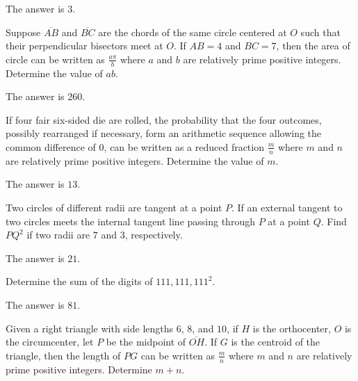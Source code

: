 \begin{solution}
The answer is $3$.
\end{solution}

\begin{problem}
Suppose $\overline{AB}$ and $\overline{BC}$ are the chords of the same circle centered at $O$ such that their perpendicular bisectors meet at $O$. If $AB=4$ and $BC=7$, then the area of circle can be written as $\frac{a\pi}{b}$ where $a$ and $b$ are relatively prime positive integers. Determine the value of $ab$.
\end{problem}

\begin{solution}
The answer is $260$.
\end{solution}

\begin{problem}
If four fair six-sided die are rolled, the probability that the four outcomes, possibly rearranged if necessary, form an arithmetic sequence allowing the common difference of $0$, can be written as a reduced fraction $\frac{m}{n}$ where $m$ and $n$ are relatively prime positive integers. Determine the value of $m$.
\end{problem}

\begin{solution}
The answer is $13$.
\end{solution}

\begin{problem}
Two circles of different radii are tangent at a point $P$. If an external tangent to two circles meets the internal tangent line passing through $P$ at a point $Q$. Find $PQ^2$ if two radii are $7$ and $3$, respectively.
\end{problem}

\begin{solution}
The answer is $21$.
\end{solution}

\begin{problem}
Determine the sum of the digits of $111,111,111^2$.
\end{problem}

\begin{solution}
The answer is $81$.
\end{solution}

\begin{problem}
Given a right triangle with side lengths $6$, $8$, and $10$, if $H$ is the orthocenter, $O$ is the circumcenter, let $P$ be the midpoint of $\overline{OH}$. If $G$ is the centroid of the triangle, then the length of $PG$ can be written as $\frac{m}{n}$ where $m$ and $n$ are relatively prime positive integers. Determine $m+n$.
\end{problem}

